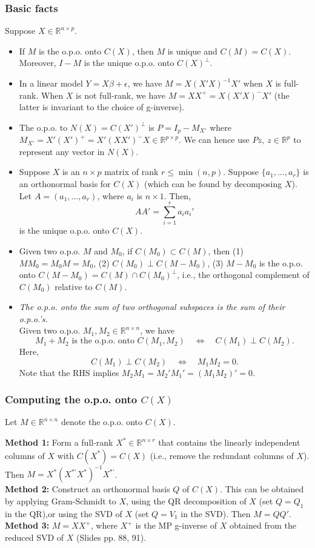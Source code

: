 \documentclass{article}
\theoremstyle{break}
\newcommand{\R}{\ensuremath{\mathbb{R}}}
\begin{document}
\subsubsection{Basic facts}
Suppose $X \in \R^{n \times p}$.
\begin{itemize}
    \item If $M$ is the o.p.o. onto $C(X)$, then $M$ is unique and $C(M) = C(X)$. Moreover, $I-M$ is the unique o.p.o. onto $C(X)^\perp$.
    \item In a linear model $Y = X\beta + \epsilon$, we have $M = X (X'X)^{-1} X'$ when $X$ is full-rank. When $X$ is not full-rank, we have $M = X X^+ = X (X'X)^- X'$ (the latter is invariant to the choice of g-inverse).
    \item The o.p.o. to $N(X) = C(X')^\perp$ is $P = I_p - M_{X'}$ where $M_{X'} = X' (X')^+ = X'(XX')^- X \in \R^{p \times p}$. We can hence use $Pz,\ z\in \R^p$ to represent any vector in $N(X)$.
    \item Suppose $X$ is an $n \times p$ matrix of rank $r \leq \min(n,p)$. 
    Suppose $\{a_1, \ldots, a_r\}$ is an orthonormal basis for $C(X)$ (which can be found by decomposing $X$). Let $A = (a_1, \ldots, a_r)$, where $a_i$ is $n \times 1$. Then,
    \[AA' = \sum_{i=1}^r a_i a_i'\]
    is the unique o.p.o. onto $C(X)$.
    \item Given two o.p.o. $M$ and $M_0$, if $C(M_0) \subset C(M)$, then (1) $MM_0 = M_0M = M_0$, (2) $C(M_0) \perp C(M-M_0)$, (3) $M - M_0$ is the o.p.o. onto $C(M-M_0) = C(M) \cap C(M_0)^\perp$, i.e., the orthogonal complement of $C(M_0)$ relative to $C(M)$.
    \item \textit{The o.p.o. onto the sum of two \emph{orthogonal} subspaces is the sum of their o.p.o.'s.}\\
    Given two o.p.o. $M_1, M_2 \in \R^{n \times n}$, we have 
    \[
    M_1 + M_2 \text{ is the o.p.o. onto $C(M_1, M_2)$} 
    \quad\Leftrightarrow\quad 
    C(M_1) \perp C(M_2).
    \]
    Here, $$C(M_1) \perp C(M_2) \quad\Leftrightarrow\quad M_1 M_2 = 0.$$
    Note that the RHS implies $M_2 M_1 = M_2' M_1' = (M_1 M_2)' = 0$.
\end{itemize}

\subsubsection{Computing the o.p.o. onto $C(X)$}
Let $M \in \R^{n \times n}$ denote the o.p.o. onto $C(X)$.

\textbf{Method 1:} Form a full-rank $X^* \in \R^{n \times r}$ that contains the linearly independent columns of $X$ with $C(X^*) = C(X)$ (i.e., remove the redundant columns of $X$). Then $M = X^* (X^{*'} X^*)^{-1} X^{*'}$.\\
\textbf{Method 2:} Construct an orthonormal basis $Q$ of $C(X)$. 
This can be obtained by applying Gram-Schmidt to $X$, using the QR decomposition of $X$ (set $Q = Q_1$ in the QR),or using the SVD of $X$ (set $Q = V_1$ in the SVD). Then $M = QQ'$.\\
\textbf{Method 3:} $M = X X^+$, where $X^+$ is the MP g-inverse of $X$ obtained from the reduced SVD of $X$ (Slides pp. 88, 91).
\end{document}
